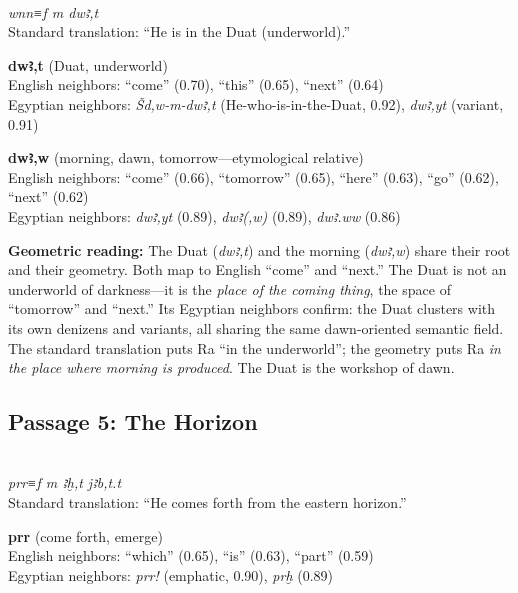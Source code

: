 \documentclass[11pt, a4paper]{article}
\newcommand{\passagehiero}[1]{{\normalfont\hierofont\fontsize{14}{17}\selectfont #1}}
\begin{document}
{\color{passage}\passagehiero{𓃹𓈖𓈖𓆑 𓅓 𓇼𓄿𓏏𓉐}\\\medskip
\textit{\small wnn≡f m dwꜣ,t}\\
Standard translation: ``He is in the Duat (underworld).''}

\bigskip

\noindent\textbf{dwꜣ,t} (Duat, underworld)\\
English neighbors: ``come'' (0.70), ``this'' (0.65), ``next'' (0.64)\\
Egyptian neighbors: \textit{Šd,w-m-dwꜣ,t} (He-who-is-in-the-Duat, 0.92), \textit{dwꜣ,yt} (variant, 0.91)

\medskip

\noindent\textbf{dwꜣ,w} (morning, dawn, tomorrow---etymological relative)\\
English neighbors: ``come'' (0.66), ``tomorrow'' (0.65), ``here'' (0.63), ``go'' (0.62), ``next'' (0.62)\\
Egyptian neighbors: \textit{dwꜣ,yt} (0.89), \textit{dwꜣ(,w)} (0.89), \textit{dwꜣ.ww} (0.86)

\medskip

{\color{insight}\textbf{Geometric reading:}} The Duat (\textit{dwꜣ,t}) and the morning (\textit{dwꜣ,w}) share their root and their geometry. Both map to English ``come'' and ``next.'' The Duat is not an underworld of darkness---it is the \textit{place of the coming thing}, the space of ``tomorrow'' and ``next.'' Its Egyptian neighbors confirm: the Duat clusters with its own denizens and variants, all sharing the same dawn-oriented semantic field. The standard translation puts Ra ``in the underworld''; the geometry puts Ra \textit{in the place where morning is produced}. The Duat is the workshop of dawn.

\subsection{Passage 5: The Horizon}

{\color{passage}\passagehiero{𓉐𓂋𓂋𓆑 𓅓 𓈌𓏏𓉐 𓇋𓄿𓃀𓏏}\\\medskip
\textit{\small prr≡f m ꜣḫ,t jꜣb,t.t}\\
Standard translation: ``He comes forth from the eastern horizon.''}

\bigskip

\noindent\textbf{prr} (come forth, emerge)\\
English neighbors: ``which'' (0.65), ``is'' (0.63), ``part'' (0.59)\\
Egyptian neighbors: \textit{prr!} (emphatic, 0.90), \textit{prḫ} (0.89)
\end{document}
